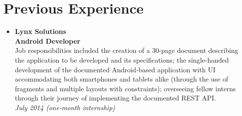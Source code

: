 \documentclass[11pt,a4paper]{article}
\begin{document}
\section*{Previous Experience}
	\begin{itemize}
	\item	{\large\textbf{Lynx Solutions}}\\
			\textbf{Android Developer}\\
			Job responsibilities included the creation of a 30-page document describing the application to be developed and its specifications; the single-handed development of the documented Android-based application with UI accommodating both smartphones and tablets alike (through the use of fragments and multiple layouts with constraints); overseeing fellow interns through their journey of implementing the documented REST API.\\
			\textit{July 2014 (one-month internship)}
	\end{itemize}

\newpage
\end{document}
